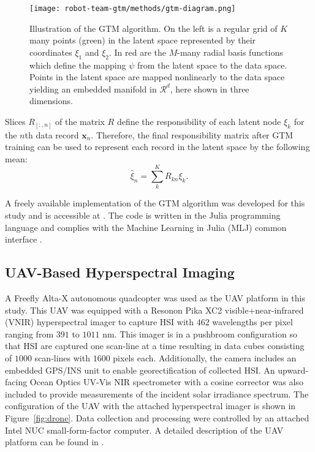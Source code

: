 \begin{figure}[H]
  \centering
  \texttt{[image: robot-team-gtm/methods/gtm-diagram.png]}
  \caption{Illustration of the GTM algorithm. On the left is a regular grid of
    $K$ many points (green) in the latent space represented by their coordinates
    $\xi_1$ and $\xi_2$. In red are the $M$-many radial basis functions which
    define the mapping $\psi$ from the latent space to the data space. Points in
    the latent space are mapped nonlinearly to the data space yielding an
    embedded manifold in $\mathcal{R}^d$, here shown in three dimensions.}
  \label{fig:gtm-diagram}
\end{figure}



Slices $R_{[:,n]}$ of the matrix $R$ define the responsibility of each latent node $\xi_k$ for the $n$th data record $\mathbf{x}_n$. Therefore, the final responsibility matrix after GTM training can be used to represent each record in the latent space by the following mean:
\begin{equation}\label{eq:mean-resp}
    \hat{\xi}_n = \sum_{k}^K R_{kn}\xi_k.
\end{equation}

A freely available implementation of the GTM algorithm was developed for this study and is accessible at \cite{gtm-code}. The code is written in the Julia programming language and complies with the Machine Learning in Julia (MLJ) common interface \cite{bezanson2012julia,blaom2020mlj}.

\subsection{UAV-Based Hyperspectral Imaging}

A Freefly Alta-X autonomous quadcopter was used as the UAV platform in this study. This UAV was equipped with a Resonon Pika XC2 visible+near-infrared (VNIR) hyperspectral imager to capture HSI with $462$ wavelengths per pixel ranging from $391$ to $1011$ nm. This imager is in a pushbroom configuration so that HSI are captured one scan-line at a time resulting in data cubes consisting of $1000$ scan-lines with $1600$ pixels each. Additionally, the camera includes an embedded GPS/INS unit to enable georectification of collected HSI. An upward-facing Ocean Optics UV-Vis NIR spectrometer with a cosine corrector was also included to provide measurements of the incident solar irradiance spectrum. The configuration of the UAV with the attached hyperspectral imager is shown in Figure~\ref{fig:drone}. Data collection and processing were controlled by an attached Intel NUC small-form-factor computer. A detailed description of the UAV platform can be found in \cite{robot-team-1}.

